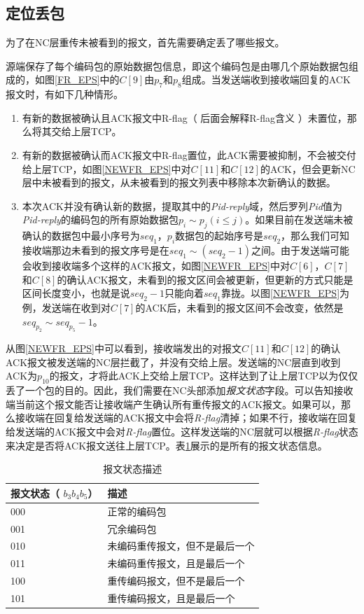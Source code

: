 \subsection{定位丢包}\label{DWDB}
为了在NC层重传未被看到的报文，首先需要确定丢了哪些报文。
\par
源端保存了每个编码包的原始数据包信息，即这个编码包是由哪几个原始数据包组成的，如图\ref{FR_EPS}中的$C\left[9\right]$由$p_7$和$p_8$组成。当发送端收到接收端回复的ACK报文时，有如下几种情形。
\begin{enumerate}[fullwidth,itemindent=2em,label=(\arabic*)]
	\item 有新的数据被确认且ACK报文中R-flag（ 后面会解释R-flag含义 ）未置位，那么将其交给上层TCP。
	\item 有新的数据被确认而ACK报文中R-flag置位，此ACK需要被抑制，不会被交付给上层TCP，如图\ref{NEWFR_EPS}中对$C\left[11\right]$和$C\left[12\right]$的ACK，但会更新NC层中未被看到的报文，从未被看到的报文列表中移除本次新确认的数据。
	\item 本次ACK并没有确认新的数据，提取其中的\emph{Pid-reply}域，然后罗列\emph{Pid}值为\emph{Pid-reply}的编码包的所有原始数据包$p_i \sim p_j(i \le j)$。如果目前在发送端未被确认的数据包中最小序号为$seq_1$，$p_i$数据包的起始序号是$seq_2$，那么我们可知接收端那边未看到的报文序号是在$seq_1 \sim \left(seq_2 - 1\right)$之间。由于发送端可能会收到接收端多个这样的ACK报文，如图\ref{NEWFR_EPS}中对$C\left[6\right]$，$C\left[7\right]$和$C\left[8\right]$的确认ACK报文，未看到的报文区间会被更新，但更新的方式只能是区间长度变小，也就是说$seq_2-1$只能向着$seq_1$靠拢。以图\ref{NEWFR_EPS}为例，发送端在收到对$C\left[7\right]$的ACK后，未看到的报文区间不会改变，依然是$seq_{p_2} \sim seq_{p_5} - 1$。
\end{enumerate}
\par
从图\ref{NEWFR_EPS}中可以看到，接收端发出的对报文$C\left[11\right]$和$C\left[12\right]$的确认ACK报文被发送端的NC层拦截了，并没有交给上层。发送端的NC层直到收到ACK为$p_{10}$的报文，才将此ACK上交给上层TCP。这样达到了让上层TCP以为仅仅丢了一个包的目的。因此，我们需要在NC头部添加\emph{报文状态}字段。可以告知接收端当前这个报文能否让接收端产生确认所有重传报文的ACK报文。如果可以，那么接收端在回复给发送端的ACK报文中会将\emph{R-flag}清掉；如果不行，接收端在回复给发送端的ACK报文中会对\emph{R-flag}置位。这样发送端的NC层就可以根据\emph{R-flag}状态来决定是否将ACK报文送往上层TCP。表\ref{tab:BWZT}展示的是所有的报文状态信息。

\begin{table}[htp]
	\centering
	\caption{报文状态描述}
	\label{tab:BWZT}
	\begin{tabular}{l|l}
		\toprule
		报文状态（ $b_3b_4b_5$） &描述\tabularnewline
		\midrule
		000		& 正常的编码包\tabularnewline
		001		& 冗余编码包 \tabularnewline
		010		& 未编码重传报文，但不是最后一个\tabularnewline
		011 	& 未编码重传报文，且是最后一个\tabularnewline
		100		& 重传编码报文，但不是最后一个\tabularnewline
		101		& 重传编码报文，且是最后一个\tabularnewline
		\bottomrule
	\end{tabular}
\end{table}
